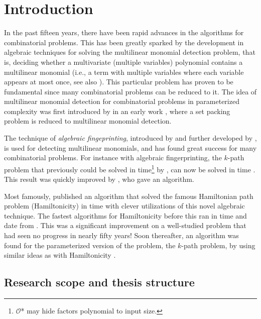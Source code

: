 
\section{Introduction}

In the past fifteen years, 
there have been rapid advances in the algorithms for combinatorial problems. 
This has been greatly sparked by the development in algebraic techniques for solving the 
multilinear monomial detection problem, that is, 
deciding whether a multivariate (multiple variables) 
polynomial contains a multilinear monomial 
(i.e., a term with multiple variables where each variable appears at most once, 
see also ). 
This particular problem has proven to be fundamental since many combinatorial 
problems can be reduced to it. 
The idea of multilinear monomial detection 
for combinatorial problems in parameterized complexity was 
first introduced by \citeauthor{Koutis05} in an early work 
\cite{Koutis05}, where a set packing problem is 
reduced to multilinear monomial detection.

The technique of \emph{algebraic fingeprinting},   
introduced by \textcite{Koutis08} and further developed by 
\textcite{Williams09}, is used for detecting multilinear monomials,  
and has found great success for many combinatorial problems. 
For instance with algebraic fingerprinting, the $k$-path problem 
that previously could be solved in  
time\footnote{$\mathcal{O}$* may hide factors polynomial to input size.} 
by \textcite{Chen07}, 
can now be solved in  time \cite{Koutis08}. 
This result was quickly improved by \textcite{Williams09}, 
who gave an  algorithm.

Most famously, 
\textcite{Björklund14} published an algorithm 
that solved the famous Hamiltonian path problem (Hamiltonicity) in  time 
with clever utilizations of this novel algebraic technique. 
The fastest algorithms for Hamiltonicity before this ran in  time 
and date from \citeyear{HelKar62} \cite{HelKar62, Bellman62}. 
This was a significant improvement on a well-studied problem 
that had seen no progress in nearly fifty years! 
Soon thereafter, an  algorithm was found
for the parameterized version of the problem, the $k$-path problem, 
by using similar ideas as with Hamiltonicity \cite{Björklund17}.

\subsection{Research scope and thesis structure}

